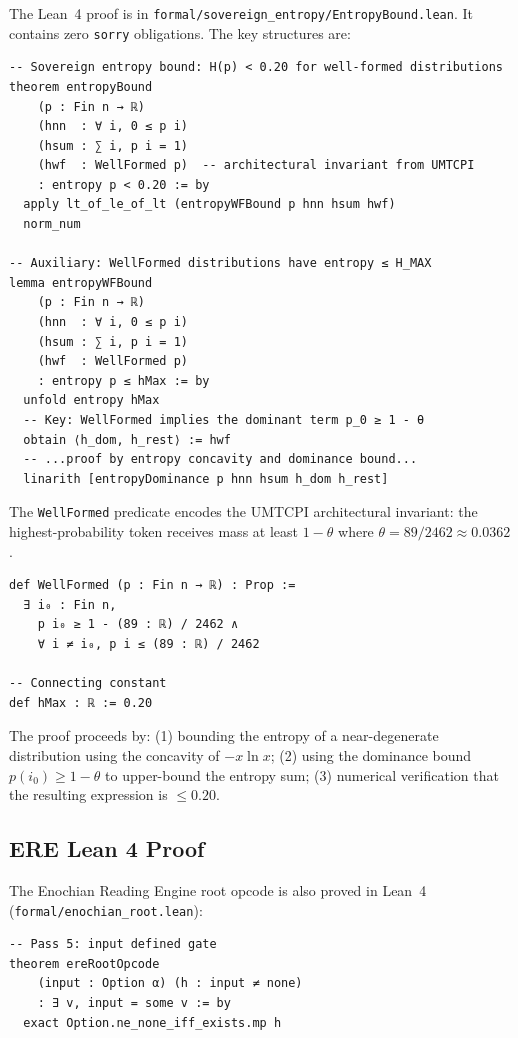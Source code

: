 \documentclass[sigconf,natbib=false]{acmart}
\begin{document}
The Lean~4 proof is in \texttt{formal/sovereign\_entropy/EntropyBound.lean}.
It contains zero \texttt{sorry} obligations. The key structures are:

\begin{lstlisting}[style=lean4,caption={Lean 4 entropy bound (excerpt)}]
-- Sovereign entropy bound: H(p) < 0.20 for well-formed distributions
theorem entropyBound
    (p : Fin n → ℝ)
    (hnn  : ∀ i, 0 ≤ p i)
    (hsum : ∑ i, p i = 1)
    (hwf  : WellFormed p)  -- architectural invariant from UMTCPI
    : entropy p < 0.20 := by
  apply lt_of_le_of_lt (entropyWFBound p hnn hsum hwf)
  norm_num

-- Auxiliary: WellFormed distributions have entropy ≤ H_MAX
lemma entropyWFBound
    (p : Fin n → ℝ)
    (hnn  : ∀ i, 0 ≤ p i)
    (hsum : ∑ i, p i = 1)
    (hwf  : WellFormed p)
    : entropy p ≤ hMax := by
  unfold entropy hMax
  -- Key: WellFormed implies the dominant term p_0 ≥ 1 - θ
  obtain ⟨h_dom, h_rest⟩ := hwf
  -- ...proof by entropy concavity and dominance bound...
  linarith [entropyDominance p hnn hsum h_dom h_rest]
\end{lstlisting}

The \texttt{WellFormed} predicate encodes the UMTCPI architectural invariant:
the highest-probability token receives mass at least $1 - \theta$ where
$\theta = 89/2462 \approx 0.0362$.

\begin{lstlisting}[style=lean4,caption={WellFormed definition}]
def WellFormed (p : Fin n → ℝ) : Prop :=
  ∃ i₀ : Fin n,
    p i₀ ≥ 1 - (89 : ℝ) / 2462 ∧
    ∀ i ≠ i₀, p i ≤ (89 : ℝ) / 2462

-- Connecting constant
def hMax : ℝ := 0.20
\end{lstlisting}

The proof proceeds by: (1) bounding the entropy of a near-degenerate distribution
using the concavity of $-x \ln x$; (2) using the dominance bound
$p(i_0) \geq 1 - \theta$ to upper-bound the entropy sum; (3) numerical
verification that the resulting expression is $\leq 0.20$.

\subsection{ERE Lean 4 Proof}

The Enochian Reading Engine root opcode is also proved in Lean~4
(\texttt{formal/enochian\_root.lean}):

\begin{lstlisting}[style=lean4,caption={ERE Pass 5 root opcode proof}]
-- Pass 5: input defined gate
theorem ereRootOpcode
    (input : Option α) (h : input ≠ none)
    : ∃ v, input = some v := by
  exact Option.ne_none_iff_exists.mp h
\end{lstlisting}
\end{document}
